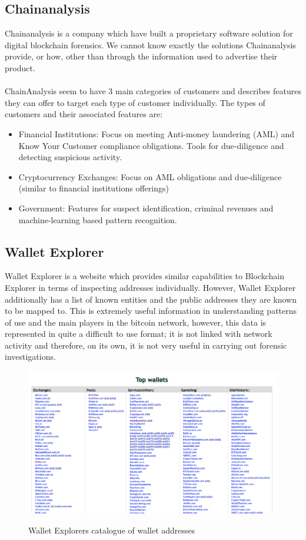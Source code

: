 \subsection{Chainanalysis}
Chainanalysis is a company which have built a proprietary software solution for digital blockchain forensics. We cannot know exactly the solutions Chainanalysis provide, or how, other than through the information used to advertise their product. 
\\\\
ChainAnalysis seem to have 3 main categories of customers and describes features they can offer to target each type of customer individually. The types of customers and their associated features are:
\begin{itemize}
    \item Financial Institutions: Focus on meeting Anti-money laundering (AML) and Know Your Customer compliance obligations. Tools for due-diligence and detecting suspicious activity. 
    \item Cryptocurrency Exchanges: Focus on AML obligations and due-diligence (similar to financial institutions offerings)
    \item Government: Features for suspect identification, criminal revenues and machine-learning based pattern recognition.
\end{itemize}

\subsection{Wallet Explorer}
Wallet Explorer is a website which provides similar capabilities to Blockchain Explorer in terms of inspecting addresses individually. However, Wallet Explorer additionally has a list of known entities and the public addresses they are known to be mapped to. This is extremely useful information in understanding patterns of use and the main players in the bitcoin network, however, this data is represented in quite a difficult to use format; it is not linked with network activity and therefore, on its own, it is not very useful in carrying out forensic investigations.

\begin{figure}[h!]
  \centering
  \includegraphics[width = 15cm]{./figures/walletexplorer}\\[0.5cm] 
  \caption{Wallet Explorers catalogue of wallet addresses \protect \footnotemark}
\end{figure}

